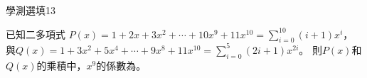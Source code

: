 \begin{QUESTIONS}
\begin{QUESTION}
        \begin{QSOLLIST}
        \end{QSOLLIST}
        \begin{QEMPTYSPACE}
        \end{QEMPTYSPACE}
    \end{QUESTION}
    \begin{QUESTION}
        \begin{ExamInfo}{84}{學測}{選填}{13}
        \end{ExamInfo}
        \begin{ExamAnsRateInfo}{}{}{}{}
        \end{ExamAnsRateInfo}
        \begin{QBODY}
            已知二多項式
            $P\left( x \right)=1+2x+3{{x}^{2}}+\cdots +10{{x}^{9}}+11{{x}^{10}}=\sum\limits_{i=0}^{10}{\left( i+1 \right){{x}^{i}}}$，
            與$Q\left( x \right)=1+3{{x}^{2}}+5{{x}^{4}}+\cdots +9{{x}^{8}}+11{{x}^{10}}=\sum\limits_{i=0}^{5}{\left( 2i+1 \right){{x}^{2i}}}$。
            則$P\left( x \right)$和$Q\left( x \right)$的乘積中，${{x}^{9}}$的係數為\TCNBOX{}。
            

\end{QBODY}
\end{QUESTION}
\end{QUESTIONS}

